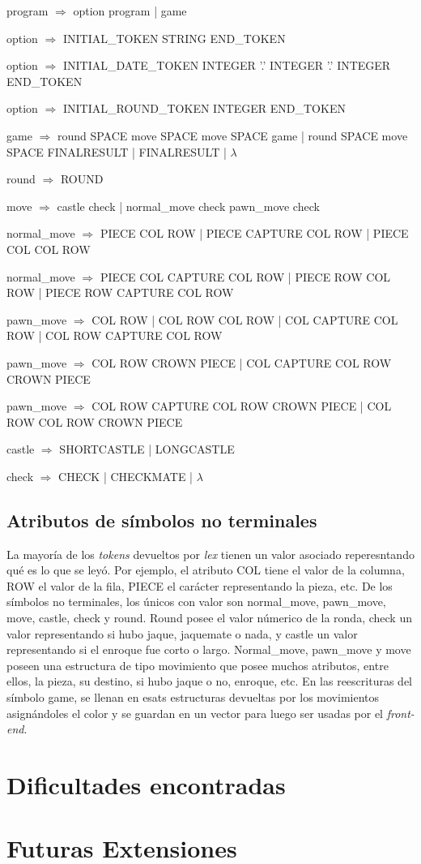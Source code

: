 \documentclass[a4paper,10pt]{article}
\begin{document}
program $\Rightarrow$ option program | game 

option $\Rightarrow$ INITIAL_TOKEN STRING END_TOKEN  

option $\Rightarrow$ INITIAL_DATE_TOKEN INTEGER '.' INTEGER '.' INTEGER END_TOKEN 

option $\Rightarrow$ INITIAL_ROUND_TOKEN INTEGER END_TOKEN 

game $\Rightarrow$ round SPACE move SPACE move SPACE game | round SPACE move SPACE FINALRESULT | FINALRESULT | $\lambda$

round $\Rightarrow$ ROUND               

move $\Rightarrow$  castle check | normal_move check pawn_move   check 

normal_move $\Rightarrow$ PIECE COL ROW | PIECE CAPTURE COL ROW | PIECE COL COL ROW         

normal_move $\Rightarrow$ PIECE COL CAPTURE COL ROW | PIECE ROW COL ROW | PIECE ROW CAPTURE COL ROW 

pawn_move $\Rightarrow$ COL ROW | COL ROW COL ROW | COL CAPTURE COL ROW  | COL ROW CAPTURE COL ROW      
       
pawn_move $\Rightarrow$ COL ROW CROWN PIECE | COL CAPTURE COL ROW CROWN PIECE     

pawn_move $\Rightarrow$ COL ROW CAPTURE COL ROW CROWN PIECE | COL ROW COL ROW CROWN PIECE         

castle $\Rightarrow$ SHORTCASTLE   | LONGCASTLE   

check $\Rightarrow$ CHECK  | CHECKMATE  | $\lambda$

\subsection{ Atributos de símbolos no terminales}

La mayoría de los \textit{tokens} devueltos por \textit{lex} tienen un valor asociado reperesntando qué es lo que se leyó. Por ejemplo, 
el atributo COL tiene el valor de la columna, ROW el valor de la fila, PIECE el carácter representando la pieza, etc.
De los símbolos no terminales, los únicos con valor son normal_move, pawn_move, move, castle, check y round. Round posee el valor númerico de la ronda, 
check un valor representando si hubo jaque, jaquemate o nada, y castle un valor representando si el enroque fue corto o largo. Normal_move, pawn_move 
y move poseen una estructura de tipo movimiento que posee muchos atributos, entre ellos, la pieza, su destino, si hubo jaque o no, enroque, etc. En las 
reescrituras del símbolo game, se llenan en esats estructuras devueltas por los movimientos asignándoles el color y se guardan en un vector para luego 
ser usadas por el \textit{front-end}.


\newpage

\section{Dificultades encontradas}
\newpage

\section{Futuras Extensiones}
   
\end{document}
